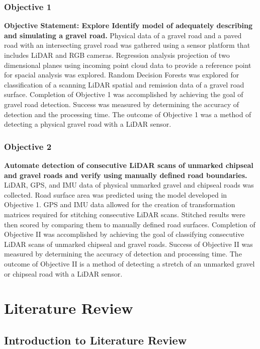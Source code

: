 \documentclass[numbered,pdftex]{ohio-etd}
\begin{document}
{	\subsection{Objective 1}
	
		{\textbf{Objective Statement: Explore Identify model of adequately describing and simulating a gravel road.} Physical data of a gravel road and a paved road with an intersecting gravel road was gathered using a sensor platform that includes LiDAR and RGB cameras. Regression analysis projection of two dimensional planes using incoming point cloud data to provide a reference point for spacial analysis was explored. Random Decision Forests was explored for classification of a scanning LiDAR spatial and remission data of a gravel road surface. Completion of Objective 1 was accomplished by achieving the goal of gravel road detection. Success was measured by determining the accuracy of detection and the processing time. The outcome of Objective 1 was a method of detecting a physical gravel road with a LiDAR sensor.}

	\subsection{Objective 2}

		{\textbf{Automate detection of consecutive LiDAR scans of unmarked chipseal and gravel roads and verify using manually defined road boundaries.} LiDAR, GPS, and IMU data of physical unmarked gravel and chipseal roads was collected. Road surface area was predicted using the model developed in Objective 1. GPS and IMU data allowed for the creation of transformation matrices required for stitching consecutive LiDAR scans. Stitched results were then scored by comparing them to manually defined road surfaces. Completion of Objective II was accomplished by achieving the goal of classifying consecutive LiDAR scans of unmarked chipseal and gravel roads. Success of Objective II was measured by determining the accuracy of detection and processing time. The outcome of Objective II is a method of detecting a stretch of an unmarked gravel or chipseal road with a LiDAR sensor.}


\chapter{Literature Review}

	\section{Introduction to Literature Review}
		
}
\end{document}
